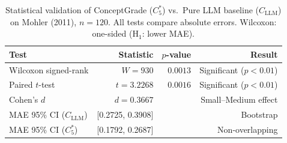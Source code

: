 \begin{table}[ht]\centering
\caption{Statistical validation of ConceptGrade ($C_5^{*}$) vs.\
Pure LLM baseline ($C_{\text{LLM}}$) on Mohler (2011), $n=120$.
All tests compare absolute errors. Wilcoxon: one-sided (H$_1$: lower MAE).}
\label{tab:statistics}
\begin{tabular}{@{}lrrr@{}}\toprule
\textbf{Test} & \textbf{Statistic} & \textbf{$p$-value} & \textbf{Result} \\\midrule
Wilcoxon signed-rank & $W=930$ & $0.0013$ & Significant ($p<0.01$) \\
Paired $t$-test & $t=3.2268$ & $0.0016$ & Significant ($p<0.01$) \\
Cohen's $d$ & $d=0.3667$ & & Small--Medium effect \\
MAE 95\% CI ($C_{\text{LLM}}$) & [0.2725, 0.3908] & & Bootstrap \\
MAE 95\% CI ($C_5^{*}$) & [0.1792, 0.2687] & & Non-overlapping \\
\bottomrule
\end{tabular}\end{table}